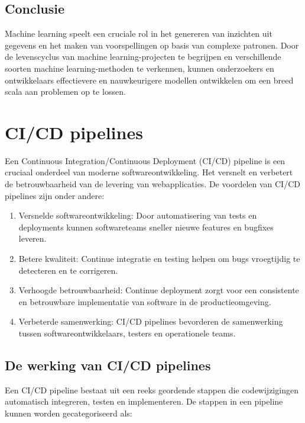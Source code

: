 \subsection{Conclusie}

Machine learning speelt een cruciale rol in het genereren van inzichten uit gegevens en het maken van voorspellingen op basis van complexe patronen. Door de levenscyclus van machine learning-projecten te begrijpen en verschillende soorten machine learning-methoden te verkennen, kunnen onderzoekers en ontwikkelaars effectievere en nauwkeurigere modellen ontwikkelen om een breed scala aan problemen op te lossen.
\section{CI/CD pipelines}

Een Continuous Integration/Continuous Deployment (CI/CD) pipeline is een cruciaal onderdeel van moderne softwareontwikkeling. Het versnelt en verbetert de betrouwbaarheid van de levering van webapplicaties. De voordelen van CI/CD pipelines zijn onder andere:

\begin{enumerate}[label=\arabic*.]
    \item Versnelde softwareontwikkeling: Door automatisering van tests en deployments kunnen softwareteams sneller nieuwe features en bugfixes leveren.
    \item Betere kwaliteit: Continue integratie en testing helpen om bugs vroegtijdig te detecteren en te corrigeren.
    \item Verhoogde betrouwbaarheid: Continue deployment zorgt voor een consistente en betrouwbare implementatie van software in de productieomgeving.
    \item Verbeterde samenwerking: CI/CD pipelines bevorderen de samenwerking tussen softwareontwikkelaars, testers en operationele teams.
\end{enumerate}

\subsection{De werking van CI/CD pipelines}

Een CI/CD pipeline bestaat uit een reeks geordende stappen die codewijzigingen automatisch integreren, testen en implementeren. De stappen in een pipeline kunnen worden gecategoriseerd als:

